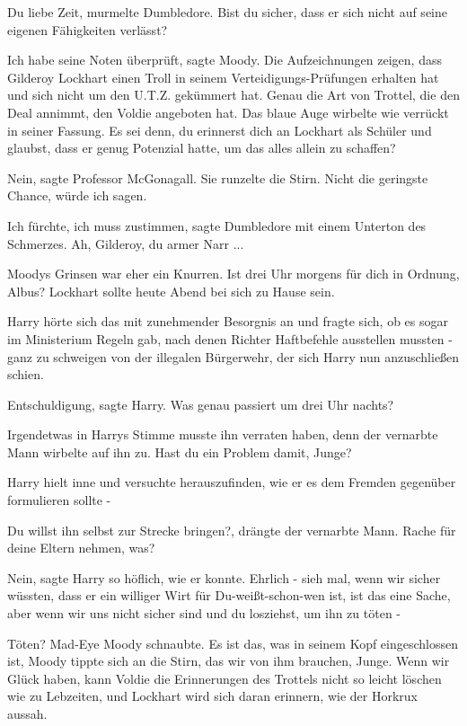 \glqq{}Du liebe Zeit\grqq{}, murmelte Dumbledore. \glqq{}Bist du sicher, dass er
sich nicht auf seine eigenen Fähigkeiten verlässt?\grqq{}

\glqq{}Ich habe seine Noten überprüft\grqq{}, sagte Moody. \glqq{}Die
Aufzeichnungen zeigen, dass Gilderoy Lockhart einen Troll in seinem
Verteidigungs-Prüfungen erhalten hat und sich nicht um den U.T.Z. gekümmert hat.
Genau die Art von Trottel, die den Deal annimmt, den Voldie angeboten
hat.\grqq{} Das blaue Auge wirbelte wie verrückt in seiner Fassung. \glqq{}Es sei
denn, du erinnerst dich an Lockhart als Schüler und glaubst, dass er genug
Potenzial hatte, um das alles allein zu schaffen?\grqq{}

\glqq{}Nein\grqq{}, sagte Professor McGonagall. Sie runzelte die Stirn. \glqq{}
Nicht die geringste Chance, würde ich sagen.\grqq{}

\glqq{}Ich fürchte, ich muss zustimmen\grqq{}, sagte Dumbledore mit einem
Unterton des Schmerzes. \glqq{}Ah, Gilderoy, du armer Narr ...\grqq{}

Moodys Grinsen war eher ein Knurren. \glqq{}Ist drei Uhr morgens für dich in
Ordnung, Albus? Lockhart sollte heute Abend bei sich zu Hause sein.\grqq{}

Harry hörte sich das mit zunehmender Besorgnis an und fragte sich, ob es sogar
im Ministerium Regeln gab, nach denen Richter Haftbefehle ausstellen mussten -
ganz zu schweigen von der illegalen Bürgerwehr, der sich Harry nun anzuschließen
schien.

\glqq{}Entschuldigung\grqq{}, sagte Harry. \glqq{}Was genau passiert um drei Uhr
nachts?\grqq{}

Irgendetwas in Harrys Stimme musste ihn verraten haben, denn der vernarbte Mann
wirbelte auf ihn zu. \glqq{}Hast du ein Problem damit, Junge?\grqq{}

Harry hielt inne und versuchte herauszufinden, wie er es dem Fremden gegenüber
formulieren sollte -

\glqq{}Du willst ihn selbst zur Strecke bringen?\grqq{}, drängte der vernarbte
Mann. \glqq{}Rache für deine Eltern nehmen, was?\grqq{}

\glqq{}Nein\grqq{}, sagte Harry so höflich, wie er konnte. \glqq{}Ehrlich - sieh
mal, wenn wir sicher wüssten, dass er ein williger Wirt für Du-weißt-schon-wen
ist, ist das eine Sache, aber wenn wir uns nicht sicher sind und du losziehst,
um ihn zu töten -\grqq{}

\glqq{}Töten?\grqq{} Mad-Eye Moody schnaubte. \glqq{}Es ist das, was in seinem
Kopf eingeschlossen ist\grqq{}, Moody tippte sich an die Stirn, \glqq{}das wir
von ihm brauchen, Junge. Wenn wir Glück haben, kann Voldie die Erinnerungen des
Trottels nicht so leicht löschen wie zu Lebzeiten, und Lockhart wird sich daran
erinnern, wie der Horkrux aussah.\grqq{}


